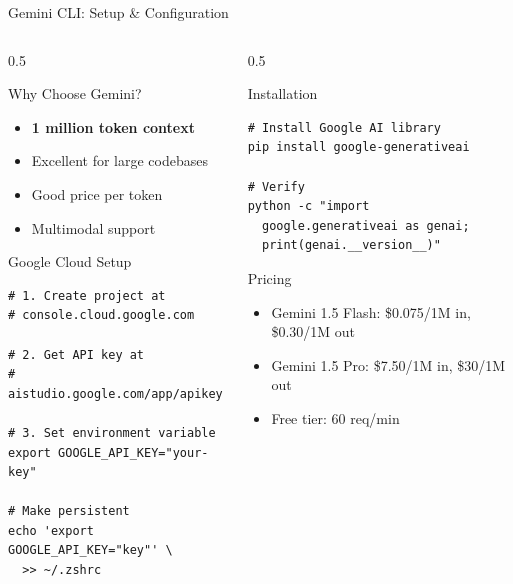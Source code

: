 \documentclass[aspectratio=169,11pt]{beamer}
\begin{document}
\begin{frame}[fragile]{Gemini CLI: Setup \& Configuration}
    \begin{columns}[T]
        \begin{column}{0.5\textwidth}
            \begin{block}{Why Choose Gemini?}
                \begin{itemize}
                    \item \textcolor{Garnet}{\textbf{1 million token context}}
                    \item Excellent for large codebases
                    \item Good price per token
                    \item Multimodal support
                \end{itemize}
            \end{block}

            \begin{block}{Google Cloud Setup}
                \begin{lstlisting}[style=bash]
# 1. Create project at
# console.cloud.google.com

# 2. Get API key at
# aistudio.google.com/app/apikey

# 3. Set environment variable
export GOOGLE_API_KEY="your-key"

# Make persistent
echo 'export GOOGLE_API_KEY="key"' \
  >> ~/.zshrc
                \end{lstlisting}
            \end{block}
        \end{column}
        \begin{column}{0.5\textwidth}
            \begin{block}{Installation}
                \begin{lstlisting}[style=bash]
# Install Google AI library
pip install google-generativeai

# Verify
python -c "import
  google.generativeai as genai;
  print(genai.__version__)"
                \end{lstlisting}
            \end{block}

            \begin{block}{Pricing}
                \small
                \begin{itemize}
                    \item Gemini 1.5 Flash: \$0.075/1M in, \$0.30/1M out
                    \item Gemini 1.5 Pro: \$7.50/1M in, \$30/1M out
                    \item Free tier: 60 req/min
                \end{itemize}
            \end{block}
        \end{column}
    \end{columns}

\end{frame}
\end{document}
